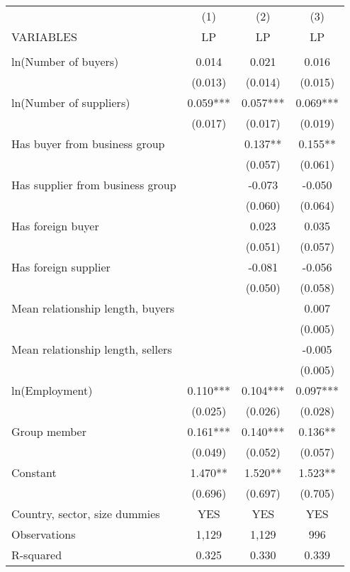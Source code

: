 
\begin{tabular}{lccc} \hline
 & (1) & (2) & (3) \\
VARIABLES & LP & LP & LP \\ \hline
 &  &  &  \\
ln(Number of buyers) & 0.014 & 0.021 & 0.016 \\
 & (0.013) & (0.014) & (0.015) \\
ln(Number of suppliers) & 0.059*** & 0.057*** & 0.069*** \\
 & (0.017) & (0.017) & (0.019) \\
Has buyer from business group &  & 0.137** & 0.155** \\
 &  & (0.057) & (0.061) \\
Has supplier from business group &  & -0.073 & -0.050 \\
 &  & (0.060) & (0.064) \\
Has foreign buyer &  & 0.023 & 0.035 \\
 &  & (0.051) & (0.057) \\
Has foreign supplier &  & -0.081 & -0.056 \\
 &  & (0.050) & (0.058) \\
Mean relationship length, buyers &  &  & 0.007 \\
 &  &  & (0.005) \\
Mean relationship length, sellers &  &  & -0.005 \\
 &  &  & (0.005) \\
ln(Employment) & 0.110*** & 0.104*** & 0.097*** \\
 & (0.025) & (0.026) & (0.028) \\
Group member & 0.161*** & 0.140*** & 0.136** \\
 & (0.049) & (0.052) & (0.057) \\
Constant & 1.470** & 1.520** & 1.523** \\
 & (0.696) & (0.697) & (0.705) \\\hline
Country, sector, size dummies &YES &YES &YES\\
Observations & 1,129 & 1,129 & 996 \\
 R-squared & 0.325 & 0.330 & 0.339 \\ \hline
\end{tabular}

